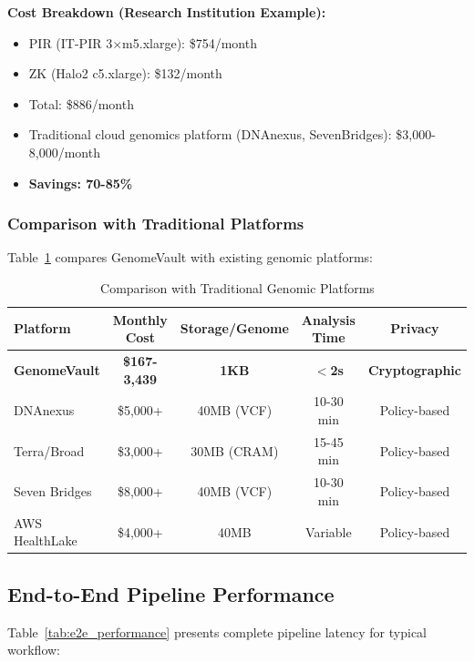 \documentclass[11pt,a4paper]{article}
\begin{document}
\textbf{Cost Breakdown (Research Institution Example):}
\begin{itemize}
    \item PIR (IT-PIR 3$\times$m5.xlarge): \$754/month
    \item ZK (Halo2 c5.xlarge): \$132/month
    \item Total: \$886/month
    \item Traditional cloud genomics platform (DNAnexus, SevenBridges): \$3,000-8,000/month
    \item \textbf{Savings: 70-85\%}
\end{itemize}

\subsubsection{Comparison with Traditional Platforms}

Table~\ref{tab:platform_comparison} compares GenomeVault with existing genomic platforms:

\begin{table}[H]
\centering
\caption{Comparison with Traditional Genomic Platforms}
\label{tab:platform_comparison}
\begin{tabular}{lcccc}
\toprule
\textbf{Platform} & \textbf{Monthly Cost} & \textbf{Storage/Genome} & \textbf{Analysis Time} & \textbf{Privacy} \\
\midrule
\textbf{GenomeVault} & \textbf{\$167-3,439} & \textbf{1KB} & \textbf{$<$2s} & \textbf{Cryptographic} \\
DNAnexus & \$5,000+ & 40MB (VCF) & 10-30 min & Policy-based \\
Terra/Broad & \$3,000+ & 30MB (CRAM) & 15-45 min & Policy-based \\
Seven Bridges & \$8,000+ & 40MB (VCF) & 10-30 min & Policy-based \\
AWS HealthLake & \$4,000+ & 40MB & Variable & Policy-based \\
\bottomrule
\end{tabular}
\end{table}

\subsection{End-to-End Pipeline Performance}

Table~\ref{tab:e2e_performance} presents complete pipeline latency for typical workflow:
\end{document}
